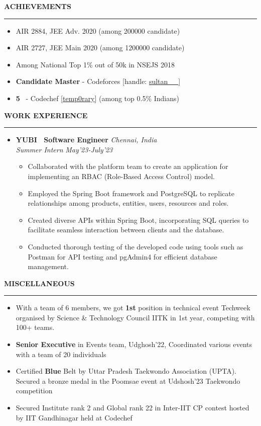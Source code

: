 \documentclass[9pt]{article}
\newcommand{\header}[1]{
	\par\addvspace{0.6cm}%
	{\Large{\textbf{\MakeUppercase{#1}}}}%
	\par\addvspace{0.3cm}%
	\hrule%
	\par\addvspace{0.3cm}%
}
\begin{document}
\begin{minipage}[t]{0.5\textwidth}


	\header{Achievements}
	\begin{itemize}[itemsep=1pt, left=0pt]
		\item AIR 2884, JEE Adv. 2020 (among 200000 candidate)	
		\item AIR 2727, JEE Main 2020 (among 1200000 candidate)
		\item Among National Top 1\% out of 50k in NSEJS 2018
		\item \textbf{Candidate Master} - Codeforces [handle: \href{https://codeforces.com/profile/sultan__/}{sultan\_\_}]
		\item \textbf{5 \faStarO{}}\ - Codechef [\href{https://www.codechef.com/users/temp0rary}{temp0rary}] (among top 0.5\% Indians)
	\end{itemize}%
	
	
	\header{work experience}
	\begin{itemize}[label={}, left=0pt]
		\item \textbf{YUBI \textbar\ Software Engineer} \hfill \textit{Chennai, India}\\
		\textit{Summer Intern} \hfill \textit{May'23-July'23}
		\vspace{-1.5mm}
		\begin{itemize}[label={\textbullet}, left=0pt]
			\item Collaborated with the platform team to create an application for implementing an RBAC (Role-Based Access Control) model.
			\item Employed the Spring Boot framework and PostgreSQL to replicate relationships among products, entities, users, resources and roles.
			\item Created diverse APIs within Spring Boot, incorporating SQL queries to facilitate seamless interaction between clients and the database.
			\item Conducted thorough testing of the developed code using tools such as Postman for API testing and pgAdmin4 for efficient database management.
		\end{itemize}%
	\end{itemize}%
	
	
	\header{Miscellaneous}
	\begin{itemize}[itemsep=1pt, label={\textbullet}, left=0pt]
		\item With a team of 6 members, we got \textbf{1st} position in technical event Techweek organised by Science \& Technology Council
IITK in 1st year, competing with 100+ teams.
		\item \textbf{Senior Executive} in Events team, Udghosh’22, Coordinated various events with a team of 20 individuals
		\item Certified \textbf{Blue} Belt by Uttar Pradesh Taekwondo Association (UPTA). Secured a bronze medal in the Poomsae event at Udshosh'23 Taekwondo competition
		\item Secured Institute rank 2 and Global rank 22 in Inter-IIT CP contest hosted by IIT Gandhinagar held at Codechef
	\end{itemize}
		
\end{minipage}%
\end{document}
